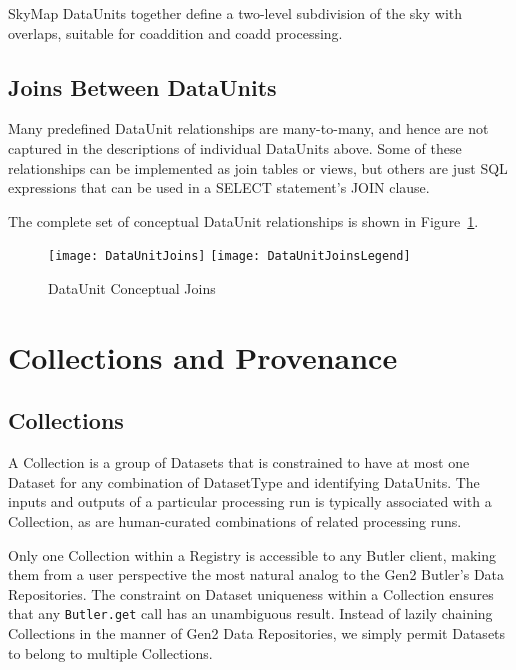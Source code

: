 \documentclass[DM,toc]{lsstdoc}
\newcommand{\unitinc}[1]{}
\newcommand{\joininc}[1]{}
\begin{document}
SkyMap DataUnits together define a two-level subdivision of the sky with overlaps, suitable for coaddition and coadd processing.

\unitinc{SkyMap}
\unitinc{Tract}
\unitinc{Patch}

\subsection{Joins Between DataUnits}
\label{sec:joins-between-dataunits}

Many predefined DataUnit relationships are many-to-many, and hence are not captured in the descriptions of individual DataUnits above.
Some of these relationships can be implemented as join tables or views, but others are just SQL expressions that can be used in a SELECT statement's JOIN clause.

The complete set of conceptual DataUnit relationships is shown in Figure~\ref{fig:DataUnitJoins}.

\begin{figure}
    \centering
    \texttt{[image: DataUnitJoins]}
    \texttt{[image: DataUnitJoinsLegend]}
    \caption{DataUnit Conceptual Joins}
    \label{fig:DataUnitJoins}
\end{figure}

\joininc{ExposureRangeJoin}
\joininc{MultiCameraExposureJoin}
\joininc{VisitSensorSkyPixJoin}
\joininc{VisitSkyPixJoin}
\joininc{PatchSkyPixJoin}
\joininc{TractSkyPixJoin}
\joininc{VisitSensorPatchJoin}
\joininc{VisitPatchJoin}
\joininc{VisitSensorTractJoin}
\joininc{VisitTractJoin}

\section{Collections and Provenance}
\label{sec:collections-and-provenance}

\subsection{Collections}
\label{sec:collections}

A Collection is a group of Datasets that is constrained to have at most one Dataset for any combination of DatasetType and identifying DataUnits.
The inputs and outputs of a particular processing run is typically associated with a Collection, as are human-curated combinations of related processing runs.

Only one Collection within a Registry is accessible to any Butler client, making them from a user perspective the most natural analog to the Gen2 Butler's Data Repositories.
The constraint on Dataset uniqueness within a Collection ensures that any \texttt{Butler.get} call has an unambiguous result.
Instead of lazily chaining Collections in the manner of Gen2 Data Repositories, we simply permit Datasets to belong to multiple Collections.
\end{document}
